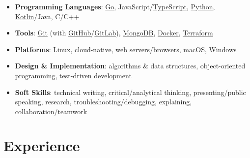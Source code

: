 \documentclass[
	a4paper,
	10pt,
	roman,
	colorlinks,
	linkcolor = purple,
	filecolor = purple,
	citecolor = blue,
	urlcolor = blue
]{moderncv}
\begin{document}

	\begin{itemize}
		\item \textbf{Programming Languages}: \href{https://go.dev}{Go}, JavaScript/\href{https://www.typescriptlang.org/}{TypeScript}, \href{https://python.org}{Python}, \href{https://kotlinlang.org}{Kotlin}/Java, C/C++
		\item \textbf{Tools}: \href{https://git-scm.com}{Git} (with \href{https://github.com}{GitHub}/\href{https://gitlab.com}{GitLab}), \href{https://www.mongodb.com}{MongoDB}, \href{https://www.docker.com}{Docker}, \href{https://terraform.io}{Terraform}
		\item \textbf{Platforms}: Linux, cloud-native, web servers/browsers, macOS, Windows
		\item \textbf{Design \& Implementation}: algorithms \& data structures, object-oriented programming, test-driven development
		\item \textbf{Soft Skills}: technical writing, critical/analytical thinking, presenting/public speaking, research, troubleshooting/debugging, explaining, collaboration/teamwork
	\end{itemize}

	\section{Experience}
\end{document}
